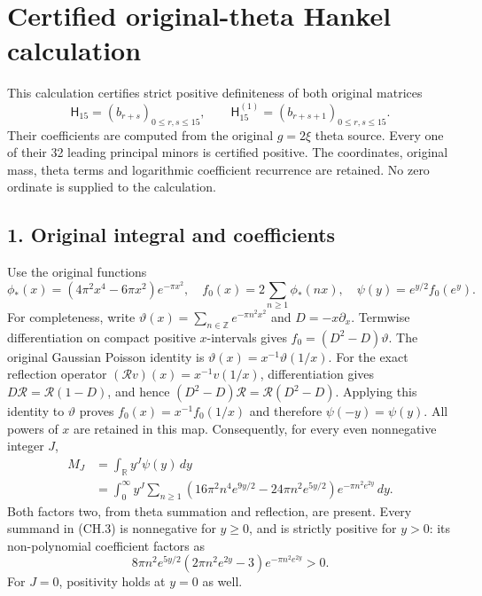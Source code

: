 \section{Certified original-theta Hankel calculation}\label{certified-original-theta-hankel-calculation}

This calculation certifies strict positive definiteness of both original matrices \[
 \mathsf H_{15}=(b_{r+s})_{0\le r,s\le15},
 \qquad
 \mathsf H_{15}^{(1)}=(b_{r+s+1})_{0\le r,s\le15}.
\tag{CH.1}
\] Their coefficients are computed from the original \(g=2\xi\) theta source. Every one of their 32 leading principal minors is certified positive. The coordinates, original mass, theta terms and logarithmic coefficient recurrence are retained. No zero ordinate is supplied to the calculation.

\subsection{1. Original integral and coefficients}\label{original-integral-and-coefficients}

Use the original functions \[
 \phi_*(x)=(4\pi^2x^4-6\pi x^2)e^{-\pi x^2},\quad
 f_0(x)=2\sum_{n\ge1}\phi_*(nx),\quad
 \psi(y)=e^{y/2}f_0(e^y).
\tag{CH.2}
\] For completeness, write \(\vartheta(x)=\sum_{n\in\mathbb Z}e^{-\pi n^2x^2}\) and \(D=-x\partial_x\). Termwise differentiation on compact positive \(x\)-intervals gives \(f_0=(D^2-D)\vartheta\). The original Gaussian Poisson identity is \(\vartheta(x)=x^{-1}\vartheta(1/x)\). For the exact reflection operator \((\mathcal Rv)(x)=x^{-1}v(1/x)\), differentiation gives \(D\mathcal R=\mathcal R(1-D)\), and hence \((D^2-D)\mathcal R=\mathcal R(D^2-D)\). Applying this identity to \(\vartheta\) proves \(f_0(x)=x^{-1}f_0(1/x)\) and therefore \(\psi(-y)=\psi(y)\). All powers of \(x\) are retained in this map. Consequently, for every even nonnegative integer \(J\), \[
\begin{split}
 M_J&=\int_{\mathbb R}y^J\psi(y)\,dy\\
 &=\int_0^\infty y^J
 \sum_{n\ge1}
 \left(16\pi^2n^4e^{9y/2}-24\pi n^2e^{5y/2}\right)
 e^{-\pi n^2e^{2y}}\,dy .
\end{split}
\tag{CH.3}
\] Both factors two, from theta summation and reflection, are present. Every summand in (CH.3) is nonnegative for \(y\ge0\), and is strictly positive for \(y>0\): its non-polynomial coefficient factors as \[
 8\pi n^2e^{5y/2}
 (2\pi n^2e^{2y}-3)e^{-\pi n^2e^{2y}}>0.
\tag{CH.4}
\] For \(J=0\), positivity holds at \(y=0\) as well.

